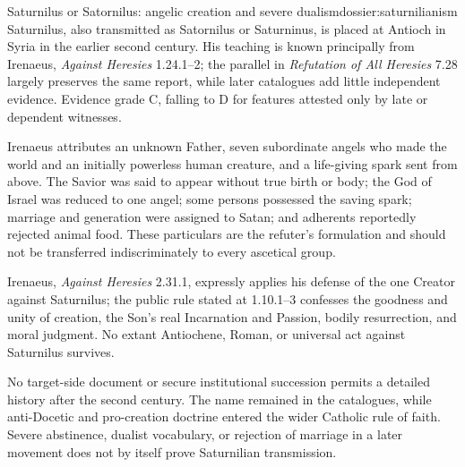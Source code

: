 \begin{heresydossier}{Saturnilus or Satornilus: angelic creation and severe dualism}{dossier:saturnilianism}
\objectfield Saturnilus, also transmitted as Satornilus or Saturninus, is placed at Antioch in Syria in the earlier second century. His teaching is known principally from Irenaeus, \emph{Against Heresies} 1.24.1--2; the parallel in \emph{Refutation of All Heresies} 7.28 largely preserves the same report, while later catalogues add little independent evidence. Evidence grade C, falling to D for features attested only by late or dependent witnesses.

\propositionfield Irenaeus attributes an unknown Father, seven subordinate angels who made the world and an initially powerless human creature, and a life-giving spark sent from above. The Savior was said to appear without true birth or body; the God of Israel was reduced to one angel; some persons possessed the saving spark; marriage and generation were assigned to Satan; and adherents reportedly rejected animal food. These particulars are the refuter's formulation and should not be transferred indiscriminately to every ascetical group.

\responsefield Irenaeus, \emph{Against Heresies} 2.31.1, expressly applies his defense of the one Creator against Saturnilus; the public rule stated at 1.10.1--3 confesses the goodness and unity of creation, the Son's real Incarnation and Passion, bodily resurrection, and moral judgment. No extant Antiochene, Roman, or universal act against Saturnilus survives.

\aftermathfield No target-side document or secure institutional succession permits a detailed history after the second century. The name remained in the catalogues, while anti-Docetic and pro-creation doctrine entered the wider Catholic rule of faith. Severe abstinence, dualist vocabulary, or rejection of marriage in a later movement does not by itself prove Saturnilian transmission.
\end{heresydossier}

